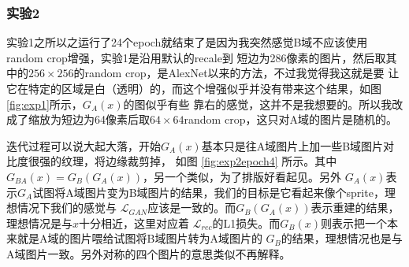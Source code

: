 \documentclass[twocolumn,11pt]{ctexart}
\begin{document}
\subsubsection{实验2}

实验1之所以之运行了24个epoch就结束了是因为我突然感觉B域不应该使用random crop增强，实验1是沿用默认的recale到
短边为286像素的图片，然后取其中的$256 \times 256$的random crop，是AlexNet以来的方法，不过我觉得我这就是要
让它在特定的区域是白（透明）的，而这个增强似乎并没有带来这个结果，如图\ref{fig:exp1}所示，$G_A(x)$的图似乎有些
靠右的感觉，这并不是我想要的。所以我改成了缩放为短边为64像素后取$64 \times 64$random crop，这只对A域的图片是随机的。

迭代过程可以说大起大落，开始$G_A(x)$基本只是往A域图片上加一些B域图片对比度很强的纹理，将边缘裁剪掉，
如图 \ref{fig:exp2epoch4} 所示。其中$G_{BA}(x)=G_B(G_A(x))$，另一个类似，为了排版好看起见。另外
$G_A(x)$表示$G_A$试图将A域图片变为B域图片的结果，我们的目标是它看起来像个sprite，理想情况下我们的感觉与
$\mathcal{L}_{GAN}$应该是一致的。而$G_B(G_A(x))$表示重建的结果，理想情况是与$x$十分相近，这里对应着
$\mathcal{L}_{rec}$的L1损失。而$G_B(x)$则表示把一个本来就是A域的图片喂给试图将B域图片转为A域图片的
$G_B$的结果，理想情况也是与A域图片一致。另外对称的四个图片的意思类似不再解释。
\end{document}
